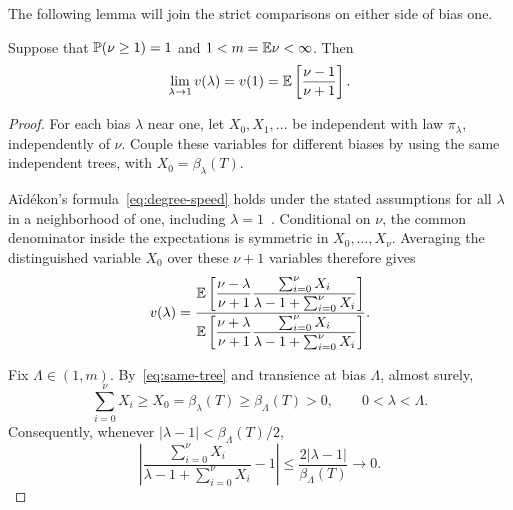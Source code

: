 The following lemma will join the strict comparisons on either side of bias one.

\begin{lemma}\label{lem:continuity-one}
Suppose that $\mathbb P(\nu\ge1)=1$ and $1<m=\mathbb E\nu<\infty$. Then
\begin{equation*}
 \lim_{\lambda\to1}v(\lambda)
 =v(1)=\mathbb E\left[\frac{\nu-1}{\nu+1}\right].
\end{equation*}
\end{lemma}

\begin{proof}
For each bias $\lambda$ near one, let $X_0,X_1,\ldots$ be independent with law $\pi_\lambda$, independently of $\nu$. Couple these variables for different biases by using the same independent trees, with $X_0=\beta_\lambda(T)$.

A\"id\'ekon's formula~\eqref{eq:degree-speed} holds under the stated assumptions for all $\lambda$ in a neighborhood of one, including $\lambda=1$~\cite[Theorem~1.1]{Aidekon}. Conditional on $\nu$, the common denominator inside the expectations is symmetric in $X_0,\ldots,X_\nu$. Averaging the distinguished variable $X_0$ over these $\nu+1$ variables therefore gives
\begin{equation}\label{eq:speed-exchangeable}
 v(\lambda)=
 \frac{
  \displaystyle\mathbb E\left[
   \frac{\nu-\lambda}{\nu+1}
   \frac{\sum_{i=0}^{\nu}X_i}
        {\lambda-1+\sum_{i=0}^{\nu}X_i}
  \right]
 }{
  \displaystyle\mathbb E\left[
   \frac{\nu+\lambda}{\nu+1}
   \frac{\sum_{i=0}^{\nu}X_i}
        {\lambda-1+\sum_{i=0}^{\nu}X_i}
  \right]
 }.
\end{equation}

Fix $\Lambda\in(1,m)$. By~\eqref{eq:same-tree} and transience at bias $\Lambda$, almost surely,
\begin{equation*}
 \sum_{i=0}^{\nu}X_i
 \ge X_0=\beta_\lambda(T)
 \ge\beta_\Lambda(T)>0,
 \qquad 0<\lambda<\Lambda.
\end{equation*}
Consequently, whenever $|\lambda-1|<\beta_\Lambda(T)/2$,
\begin{equation*}
 \left|
 \frac{\sum_{i=0}^{\nu}X_i}
      {\lambda-1+\sum_{i=0}^{\nu}X_i}-1
 \right|
 \le\frac{2|\lambda-1|}{\beta_\Lambda(T)}
 \longrightarrow0.
\end{equation*}


\end{proof}
